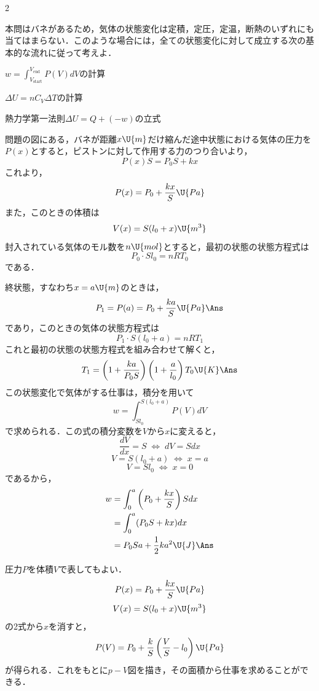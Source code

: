 \begin{multicols}{2}
\par\nopagebreak
\begin{sisin}
本問はバネがあるため，気体の状態変化は定積，定圧，定温，断熱のいずれにも当てはまらない．このような場合には，全ての状態変化に対して成立する次の基本的な流れに従って考えよ．
\begin{list}{}{\setlength{\leftmargin}{1.6zw}\setlength{\itemsep}{0.3mm}\setlength{\topsep}{0.6mm}\setlength{\parsep}{0pt}}
\item[\MARU{1}] $w=\displaystyle\int_{V_{\mathrm{start}}}^{V_{\mathrm{end}}}P(V)dV$の計算
\item[\MARU{2}] $\Delta U=nC_V\Delta T$の計算
\item[\MARU{3}] 熱力学第一法則$\Delta U=Q+(-w)$の立式
\end{list}
\end{sisin}
\KaiHead
問題の図にある，バネが距離$x\U{m}$だけ縮んだ途中状態における気体の圧力を$P(x)$とすると，ピストンに対して作用する力のつり合いより，
\[P(x)S=P_0S+kx\]
これより，
\[P(x)=P_0+\frac{kx}{S}\U{Pa}\]
また，このときの体積は
\[V(x)=S(l_0+x)\U{m^3}\]
封入されている気体のモル数を$n\U{mol}$とすると，最初の状態の状態方程式は
\[P_0\cdot Sl_0=nRT_0\]
である．
\begin{komon}
 終状態，すなわち$x=a\U{m}$のときは，
       \[P_1=P(a)=P_0+\frac{ka}{S}\U{Pa}\Ans\]
       であり，このときの気体の状態方程式は
       \[P_1\cdot S(l_0+a)=nRT_1\]
       これと最初の状態の状態方程式を組み合わせて解くと，
       \[T_1=\left(1+\frac{ka}{P_0S}\right)\left(1+\frac{a}{l_0}\right)T_0\U{K}\Ans\]
 この状態変化で気体がする仕事は，積分を用いて
       \[w=\int_{Sl_0}^{S(l_0+a)}P(V)dV\]
       で求められる．この式の積分変数を$V$から$x$に変えると，
       \[\frac{dV}{dx}=S\;\Leftrightarrow\;dV=Sdx\]
       \[V=S(l_0+a)\;\Leftrightarrow\;x=a\]
       \[V=Sl_0\;\Leftrightarrow\;x=0\]
       であるから，
       \[\begin{aligned}
         w&=\int_0^a\left(P_0+\frac{kx}{S}\right)Sdx\\
          &=\int_0^a(P_0S+kx)dx\\
          &=P_0Sa+\frac{1}{2}ka^2\U{J}\Ans
       \end{aligned}\]
       \begin{chuu}
       圧力$P$を体積$V$で表してもよい．
       \[P(x)=P_0+\frac{kx}{S}\U{Pa}\]
       \[V(x)=S(l_0+x)\U{m^3}\]
       の2式から$x$を消すと，
       \[P(V)=P_0+\frac{k}{S}\left(\frac{V}{S}-l_0\right)\U{Pa}\]
       が得られる．これをもとに$p-V$図を描き，その面積から仕事を求めることができる．

\end{chuu}
\end{komon}
\end{multicols}
